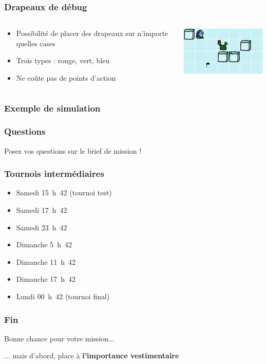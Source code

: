\documentclass{beamer}
\begin{document}
\begin{frame}
    \frametitle{Drapeaux de débug}
    \begin{columns}[T]
    \begin{column}{0.5\textwidth}
        \begin{itemize}
            \item Possibilité de placer des drapeaux sur n'importe quelles cases
            \item Trois types : rouge, vert, bleu
            \item Ne coûte pas de points d'action
        \end{itemize}
    \end{column}
    \begin{column}{0.5\textwidth}
        \centering
        \includegraphics[width=5cm]{../img/debug_flags}
    \end{column}
    \end{columns}    
\end{frame}

\begin{frame}
    \frametitle{Exemple de simulation}
\end{frame}

\begin{frame}
    \frametitle{Questions}
    Posez vos questions sur le brief de mission !
\end{frame}

\begin{frame}
    \frametitle{Tournois intermédiaires}
    \begin{itemize}
        \item Samedi 15~h~42 (tournoi test)
        \item Samedi 17~h~42
        \item Samedi 23~h~42
        \item Dimanche 5~h~42
        \item Dimanche 11~h~42
        \item Dimanche 17~h~42
        \item Lundi 00~h~42 (tournoi final)
    \end{itemize}
\end{frame}

\begin{frame}
    \frametitle{Fin}
    Bonne chance pour votre mission...
    \pause

    ... mais d'abord, place à \textbf{l'importance vestimentaire}
\end{frame}
\end{document}
